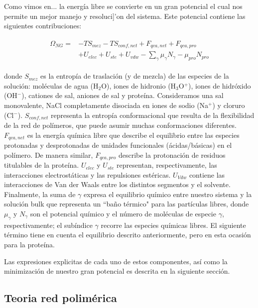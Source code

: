 Como vimos en... la energ\'ia libre se convierte en un gran potencial el cual nos permite un mejor manejo y resoluci]'on del sistema.
Este potencial contiene las siguientes contribuciones:

\begin{align}
\begin{aligned}
\Omega_{NG}=& -TS_{mez} -TS_{conf,net} + F_{qca,net} + F_{qca,pro}\\
& + U_{elec} + U_{ste} + U_{vdw} - \sum_{\gamma}{\mu_\gamma N_\gamma} - \mu_{pro} N_{pro}
\end{aligned}
\label{eq:esf:semicano}
\end{align}


\noindent donde $S_{mez}$ es la entrop\'ia de traslaci\'on (y de mezcla) de las especies de la soluci\'on: mol\'eculas de agua (H$_2$O), iones de hidronio (H$_3$O$^+$), iones de hidr\'oxido (OH$^- $), cationes de sal, aniones de sal y prote\'ina.
Consideramos una sal monovalente, NaCl completamente disociada en iones de sodio (Na$^+$) y cloruro (Cl$^-$).
$S_{conf,net}$ representa la entrop\'ia conformacional que resulta de la flexibilidad de la red de pol\'imeros, que puede asumir muchas conformaciones diferentes.
$F_{qca,net}$ es la energ\'ia qu\'imica libre que describe el equilibrio entre las especies protonadas y desprotonadas de unidades funcionales (\'acidas/b\'asicas) en el pol\'imero.
De manera similar, $F_{qca,pro}$ describe la protonaci\'on de residuos titulables de la prote\'ina.
$U_{elec}$ y $U_{ste}$ representan, respectivamente, las interacciones electrost\'aticas y las repulsiones est\'ericas.
$U_{Vdw}$ contiene las interacciones de Van der Waals entre los distintos segmentos y el solvente.
Finalmente, la suma de $\gamma$ expresa el equilibrio qu\'imico entre nuestro sistema y la soluci\'on bulk que representa un ``ba\~no t\'ermico" para las part\'iculas libres, donde $\mu_\gamma$ y $N_\gamma$ son el potencial qu\'imico y el n\'umero de mol\'eculas de especie $\gamma$, respectivamente;
el sub\'indice $\gamma$ recorre las especies qu\'imicas libres.
El siguiente t\'ermino tiene en cuenta el equilibrio descrito anteriormente, pero en esta ocasi\'on para la prote\'ina.

Las expresiones explicitas de cada uno de estos componentes, as\'i como la minimizaci\'on de nuestro gran potencial es descrita en la siguiente secci\'on.



\subsection{Teoria red polim\'erica}\label{sec:esf:tm}

